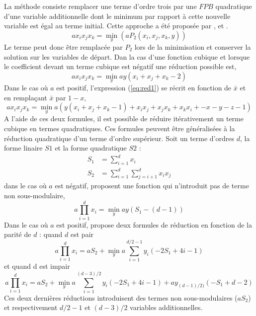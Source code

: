 \documentclass[../main/These_Mathias_Paget.tex]{subfiles}
\begin{document}
La méthode consiste remplacer une terme d'ordre trois par une $FPB$ quadratique d'une variable additionnelle dont le minimum par rapport à cette nouvelle variable est égal au terme initial. Cette approche a été proposée par \cite{Kolmogorov04PAMI}, et \cite{Freedman05CVPR}.
\begin{equation}
ax_{i}x_{j}x_{k} = \min_{y}{(aP_2(x_i,x_j,x_k,y))}
\end{equation}
Le terme peut donc être remplacée par $P_2$ lors de la minimisation et conserver la solution sur les variables de départ.
Dan la cas d'une fonction cubique et lorsque le coefficient devant un terme cubique est négatif une réduction possible est,
\begin{equation}
\label{eq:red1}
ax_{i}x_{j}x_{k} = \min_{y}{ay(x_i+x_j+x_k-2)}
\end{equation}
Dans le cas où $a$ est positif, l’expression (\ref{eq:red1}) se récrit en fonction de $\bar{x}$ et en remplaçant $\bar{x}$ par $1{-}x$,
\begin{equation}
\label{eq:red2}
ax_{i}x_{j}x_{k} = \min_{y}{a(y(x_i+x_j+x_k-1) + x_ix_j + x_jx_k + x_kx_i + - x - y - z -1)}
\end{equation}
A l'aide de ces deux formules, il est possible de réduire itérativement un terme cubique en termes quadratiques. Ces formules peuvent être généralisées à la réduction quadratique d'un terme d'ordre supérieur. Soit un terme d'ordres $d$, la forme linaire $S1$ et la forme quadratique $S2$ :
\begin{equation}
	\begin{aligned}
		S_1 &= \sum_{i=1}^{d}{x_i} \\
		S_2 &= \sum_{i=1}^{d}{ \sum_{j=i+1}^{d}{x_ix_j}}
	\end{aligned}
\end{equation}
dans le cas où $a$ est négatif, \cite{Freedman05CVPR} proposent une fonction qui n'introduit pas de terme non sous-modulaire,
\begin{equation}
	a\prod_{i=1}^{d}{x_i} = \min_{y}{ay(S_1 - (d-1) )}
\end{equation}
Dans le cas où $a$ est positif, \cite{Ishikawa11PAMI} propose deux formules de réduction en fonction de la parité de $d$ : quand $d$ est pair
\begin{equation}
	a\prod_{i=1}^{d}{x_i} = aS_2 + \min_{y}{a \sum_{i=1}^{d/2-1}{y_i(-2S_1 + 4i -1)}}
\end{equation}
et quand d est impair
\begin{equation}
	a\prod_{i=1}^{d}{x_i} = aS_2 +  \min_{y}{a \sum_{i=1}^{ (d-3)/2 }{y_i(-2S_1 + 4i -1)} + ay_{(d-1)/2)}(-S_1 +d - 2)}
\end{equation}
Ces deux dernières réductions introduisent des termes non sous-modulaires ($aS_2$) et respectivement $d/2-1$ et $(d-3)/2$ variables additionnelles.
\end{document}
